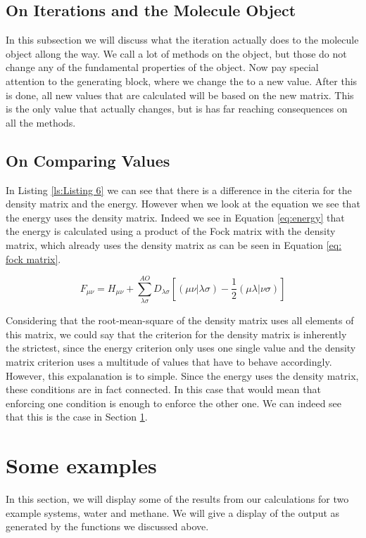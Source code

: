 \subsection{On Iterations and the Molecule Object}
\label{subsec: iteration}
In this subsection we will discuss what the iteration actually does to the 
molecule object allong the way. We call a lot of methods on the object, but those 
do not change any of the fundamental properties of the object. Now pay special
attention to the generating block, where we change the 
 to a new value. After this is done, all new values
that are calculated will be based on the new matrix. This is the only value that 
actually changes, but is has far reaching consequences on all the methods. 

 
 \subsection{On Comparing Values}
 \label{subsec:step6.1}
In Listing \ref{ls:Listing 6} we can see that there is a difference in the
citeria for the density matrix and the energy. However when we look at the 
equation we see that the energy uses the density matrix. Indeed we see in 
Equation \ref{eq:energy} that the energy is calculated using a 
product of the Fock matrix with the density matrix, which already uses the density
matrix as can be seen in Equation \ref{eq: fock matrix}.
 
 \begin{equation} \label{eq: fock matrix}
     F_{\mu\nu} = H_{\mu\nu} + \sum^{AO}_{\lambda\sigma}D_{\lambda\sigma}[(\mu\nu|\lambda\sigma) - \frac{1}{2}(\mu\lambda|\nu\sigma)]
 \end{equation}

Considering that the root-mean-square of the density matrix uses all elements of 
this matrix, we could say that the criterion for the density matrix is inherently
the strictest, since the energy criterion only uses one single value and the 
density matrix criterion uses a multitude of values that have to behave 
accordingly. However, this expalanation is to simple. Since the energy uses 
the density matrix, these conditions are in fact connected. In this case that 
would mean that enforcing one condition is enough to enforce the other one. 
We can indeed see that this is the case in Section \ref{sec: examples}. 

 
 \section{Some examples}
 \label{sec: examples}
 In this section, we will display some of the results from our calculations for 
 two example systems, water and methane. We will give a display of the output as 
 generated by the functions we discussed above.
 
